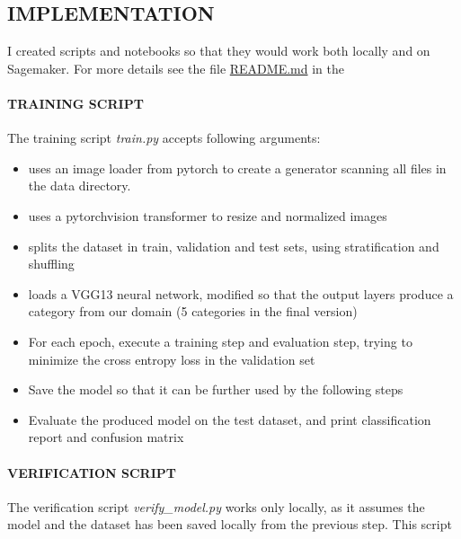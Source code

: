 \documentclass[
]{article}
\providecommand{\tightlist}{%
  \setlength{\itemsep}{0pt}\setlength{\parskip}{0pt}}
\newcommand{\hhref}[3][blue]{\href{#2}{\color{#1}{#3}}}%
\begin{document}
\hypertarget{implementation}{%
\subsection{IMPLEMENTATION}\label{implementation}}

I created scripts and notebooks so that they would work both locally and
on Sagemaker. For more details see the file \url{README.md} in the \hhref{https://github.com/diegoami/DA_ML_Capstone}{Github repository}

\hypertarget{training-script}{%
\paragraph{TRAINING SCRIPT}\label{training-script}}

The training script \emph{train.py} accepts following arguments:

\begin{itemize}
\tightlist
\item
  uses an image loader from pytorch to create a generator scanning all
  files in the data directory.
\item
  uses a pytorchvision transformer to resize and normalized images
\item
  splits the dataset in train, validation and test sets, using
  stratification and shuffling
\item
  loads a VGG13 neural network, modified so that the output layers produce
  a category from our domain (5 categories in the final version)
\item
  For each epoch, execute a training step and evaluation step, trying to
  minimize the cross entropy loss in the validation set
\item
  Save the model so that it can be further used by the following steps
\item
  Evaluate the produced model on the test dataset, and print
  classification report and confusion matrix
\end{itemize}

\hypertarget{verification-script}{%
\paragraph{VERIFICATION SCRIPT}\label{verification-script}}

The verification script \emph{verify\_model.py} works only locally, as
it assumes the model and the dataset has been saved locally from the previous
step. This script
\end{document}
